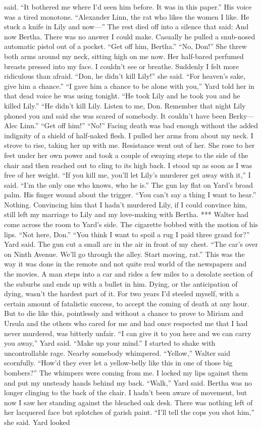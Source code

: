 \documentclass{novel}
\begin{document}
said. “It bothered me where I’d seen him before. It was in this paper.” His voice was a tired monotone. “Alexander Linn, the rat who likes the women I like. He stuck a knife in Lily and now—” The rest died off into a silence that said: And now Bertha. There was no answer I could make. Casually he pulled a snub-nosed automatic pistol out of a pocket. “Get off him, Bertha.” “No, Don!” She threw both arms around my neck, sitting high on me now. Her half-bared perfumed breasts pressed into my face. I couldn’t see or breathe. Suddenly I felt more ridiculous than afraid. “Don, he didn’t kill Lily!” she said. “For heaven’s sake, give him a chance.” “I gave him a chance to be alone with you,” Yard told her in that dead voice he was using tonight. “He took Lily and he took you and he killed Lily.” “He didn’t kill Lily. Listen to me, Don. Remember that night Lily phoned you and said she was scared of somebody. It couldn’t have been Berky—Alec Linn.” “Get off him!” “No!” Facing death was bad enough without the added indignity of a shield of half-naked flesh. I pulled her arms from about my neck. I strove to rise, taking her up with me. Resistance went out of her. She rose to her feet under her own power and took a couple of swaying steps to the side of the chair and then reached out to cling to its high back. I stood up as soon as I was free of her weight. “If you kill me, you’ll let Lily’s murderer get away with it,” I said. “I’m the only one who knows, who he is.” The gun lay flat on Yard’s broad palm. His finger wound about the trigger. “You can’t say a thing I want to hear.” Nothing. Convincing him that I hadn’t murdered Lily, if I could convince him, still left my marriage to Lily and my love-making with Bertha. *** Walter had come across the room to Yard’s side. The cigarette bobbed with the motion of his lips. “Not here, Don.” “You think I want to spoil a rug I paid three grand for?” Yard said. The gun cut a small arc in the air in front of my chest. “The car’s over on Ninth Avenue. We’ll go through the alley. Start moving, rat.” This was the way it was done in the remote and not quite real world of the newspapers and the movies. A man steps into a car and rides a few miles to a desolate section of the suburbs and ends up with a bullet in him. Dying, or the anticipation of dying, wasn’t the hardest part of it. For two years I’d steeled myself, with a certain amount of fatalistic success, to accept the coming of death at any hour. But to die like this, pointlessly and without a chance to prove to Miriam and Ursula and the others who cared for me and had once respected me that I had never murdered, was bitterly unfair. “I can give it to you here and we can carry you away,” Yard said. “Make up your mind.” I started to shake with uncontrollable rage. Nearby somebody whimpered. “Yellow,” Walter said scornfully. “How’d they ever let a yellow-belly like this in one of those big bombers?” The whimpers were coming from me. I locked my lips against them and put my unsteady hands behind my back. “Walk,” Yard said. Bertha was no longer clinging to the back of the chair. I hadn’t been aware of movement, but now I saw her standing against the bleached oak desk. There was nothing left of her lacquered face but splotches of garish paint. “I’ll tell the cops you shot him,” she said. Yard looked 
\end{document}
